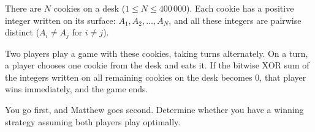 \documentclass[12pt]{article}
\begin{document}
There are $N$ cookies on a desk ($1 \le N \le 400\,000$). Each cookie has a positive integer written on its surface: $A_1, A_2, \dots, A_N$, and all these integers are pairwise distinct ($A_i \neq A_j$ for $i \neq j$).

Two players play a game with these cookies, taking turns alternately. On a turn, a player chooses one cookie from the desk and eats it. If the bitwise XOR sum of the integers written on all remaining cookies on the desk becomes $0$, that player wins immediately, and the game ends.

You go first, and Matthew goes second. Determine whether you have a winning strategy assuming both players play optimally.
\end{document}
